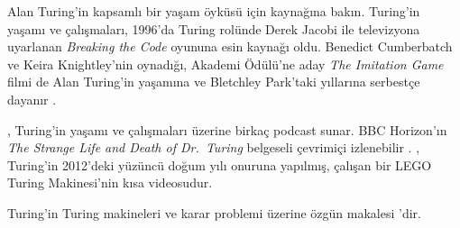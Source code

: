\documentclass[../../../include/open-logic-section]{subfiles}
\begin{document}
\begin{reading}
Alan Turing'in kapsamlı bir yaşam öyküsü için \citet{Hodges2014} kaynağına
bakın. Turing'in yaşamı ve çalışmaları, 1996'da Turing rolünde Derek Jacobi
ile televizyona uyarlanan \emph{Breaking the Code} oyununa esin kaynağı oldu.
Benedict Cumberbatch ve Keira Knightley'nin oynadığı, Akademi Ödülü'ne aday
\emph{The Imitation Game} filmi de Alan Turing'in yaşamına ve Bletchley
Park'taki yıllarına serbestçe dayanır \citep{Imitation2014}.

\citet{Radiolab2012}, Turing'in yaşamı ve çalışmaları üzerine birkaç podcast
sunar. BBC Horizon'ın \emph{The Strange Life and Death of Dr.~Turing}
belgeseli çevrimiçi izlenebilir \citep{Sykes1992}. \citep{Theelen2012},
Turing'in 2012'deki yüzüncü doğum yılı onuruna yapılmış, çalışan bir LEGO
Turing Makinesi'nin kısa videosudur.

Turing'in Turing makineleri ve karar problemi üzerine özgün makalesi
\citet{Turing1937}'dir.
\end{reading}
\end{document}
